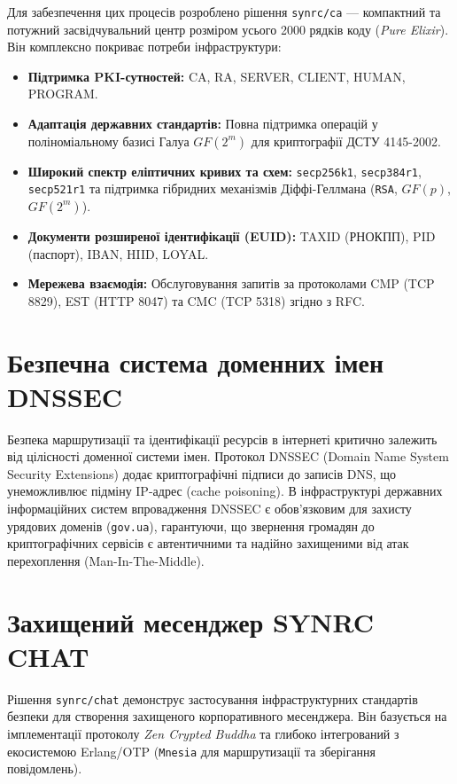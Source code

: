 Для забезпечення цих процесів розроблено рішення \texttt{synrc/ca} — компактний та потужний засвідчувальний центр розміром усього 2000 рядків коду (\emph{Pure Elixir}). Він комплексно покриває потреби інфраструктури:
\begin{itemize}
    \item \textbf{Підтримка PKI-сутностей:} CA, RA, SERVER, CLIENT, HUMAN, PROGRAM.
    \item \textbf{Адаптація державних стандартів:} Повна підтримка операцій у поліноміальному базисі Галуа $GF(2^m)$ для криптографії ДСТУ 4145-2002.
    \item \textbf{Широкий спектр еліптичних кривих та схем:} \texttt{secp256k1}, \texttt{secp384r1}, \texttt{secp521r1} та підтримка гібридних механізмів Діффі-Геллмана (\texttt{RSA}, $GF(p)$, $GF(2^m)$).
    \item \textbf{Документи розширеної ідентифікації (EUID):} TAXID (РНОКПП), PID (паспорт), IBAN, HIID, LOYAL.
    \item \textbf{Мережева взаємодія:} Обслуговування запитів за протоколами CMP (TCP 8829), EST (HTTP 8047) та CMC (TCP 5318) згідно з RFC.
\end{itemize}

\section{Безпечна система доменних імен DNSSEC}

Безпека маршрутизації та ідентифікації ресурсів в інтернеті критично залежить від цілісності доменної системи імен. Протокол DNSSEC (Domain Name System Security Extensions) додає криптографічні підписи до записів DNS, що унеможливлює підміну IP-адрес (cache poisoning). В інфраструктурі державних інформаційних систем впровадження DNSSEC є обов'язковим для захисту урядових доменів (\texttt{gov.ua}), гарантуючи, що звернення громадян до криптографічних сервісів є автентичними та надійно захищеними від атак перехоплення (Man-In-The-Middle).

\newpage
\section{Захищений месенджер SYNRC CHAT}

Рішення \texttt{synrc/chat} демонструє застосування інфраструктурних стандартів безпеки для створення захищеного корпоративного месенджера. Він базується на імплементації протоколу \emph{Zen Crypted Buddha} та глибоко інтегрований з екосистемою Erlang/OTP (\texttt{Mnesia} для маршрутизації та зберігання повідомлень).


